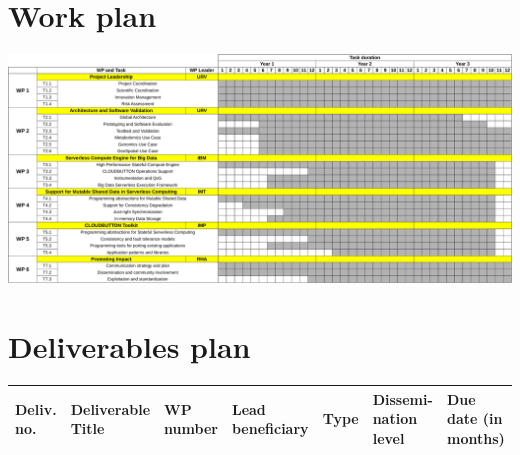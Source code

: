 \documentclass[a4paper,11pt]{article}
\begin{document}
\begin{appendices}

\section{Work plan}
\label{appendix:work_plan}

\mbox{} 
\begin{center}
	\begin{sideways}%
         \begin{minipage}{1.35\linewidth}
                    \includegraphics[width=\linewidth,keepaspectratio]{figures/CLOUDBUTTON_work_plan}
         \vspace{0.2cm}
         \label{fig:xx}
         \end{minipage}
    \end{sideways}
\end{center}

\section{Deliverables plan}
\label{appendix:deliverables}

{
\def\arraystretch{1.5}
\begin{center}
\begin{longtable}{ |p{1.0cm} | p{4.5cm} | p{1.5cm} | p{1.5cm}  | p{2cm}  | p{2.3cm}  | p{1.3cm} | }
\hline
\rowcolor[gray]{.8} \textbf{Deliv. no.} & \textbf{Deliverable Title} &
  \textbf{WP number} & \textbf{Lead beneficiary} & \textbf{Type} & \textbf{Dissemi-nation level} & \textbf{Due date (in months)} \\ \hline


\end{longtable}
\end{center}}
\end{appendices}
\end{document}
